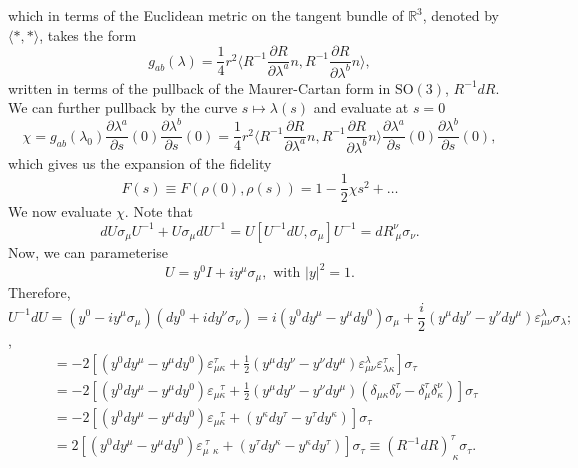 which in terms of the Euclidean metric on the tangent bundle of $\mathbb{R}^3$, denoted by $\langle \ast , \ast\rangle$, takes the form
\begin{equation*} 
g_{ab}(\lambda)=\frac{1}{4} r^2\langle R^{-1}\frac{\partial R}{\partial \lambda^{a}}n,  R^{-1}\frac{\partial R}{\partial \lambda^{b}} n\rangle,
\end{equation*}
written in terms of the pullback of the Maurer-Cartan form in $\text{SO}(3)$, $R^{-1}dR$. We can further pullback by the curve $s\mapsto \lambda(s)$ and evaluate at $s=0$
\begin{equation*}
\chi=g_{ab}(\lambda_0)\frac{\partial \lambda^a}{\partial s}(0)\frac{\partial \lambda^{b}}{\partial s}(0)=\frac{1}{4} r^2\langle R^{-1}\frac{\partial R}{\partial \lambda^{a}}n,  R^{-1}\frac{\partial R}{\partial \lambda^{b}} n\rangle\frac{\partial \lambda^a}{\partial s}(0)\frac{\partial \lambda^{b}}{\partial s}(0),
\end{equation*}
which gives us the expansion of the fidelity
\begin{equation*}
F(s)\equiv F(\rho(0),\rho(s))=1-\frac{1}{2}\chi s^2 +\dots
\end{equation*}
We now evaluate $\chi$. Note that
\begin{equation*}
dU\sigma_{\mu}U^{-1} +U\sigma_{\mu}dU^{-1} = U[U^{-1}dU,\sigma_{\mu}]U^{-1} = dR^{\nu}_{\ \mu}\sigma_\nu.
\end{equation*}
Now, we can parameterise
\begin{equation*}
U=y^{0}I+iy^{\mu}\sigma_{\mu}, \text{ with } |y|^2=1. 
\end{equation*}
Therefore,
\begin{equation*}
U^{-1}dU=(y^0 -iy^{\mu}\sigma_\mu)(dy^0 +idy^{\nu}\sigma_{\nu})
=i(y^0dy^{\mu}-y^{\mu}dy^{0})\sigma_{\mu}+\frac{i}{2}(y^{\mu}dy^{\nu} - y^{\nu}dy^{\mu})\varepsilon_{\mu\nu}^{\lambda}\sigma_{\lambda};
\end{equation*},
\begin{eqnarray*}
[U^{-1}dU,\sigma_{\kappa}]&=-2\left[(y^0dy^{\mu}-y^{\mu}dy^{0})\varepsilon_{\mu\kappa}^{\tau}+\frac{1}{2}(y^{\mu}dy^{\nu} - y^{\nu}dy^{\mu})\varepsilon_{\mu\nu}^{\lambda}\varepsilon_{\lambda\kappa}^{\tau}\right]\sigma_{\tau}\\
&=-2\left[(y^0dy^{\mu}-y^{\mu}dy^{0})\varepsilon_{\mu\kappa}^{\ \ \ \tau}+\frac{1}{2}(y^{\mu}dy^{\nu} - y^{\nu}dy^{\mu})(\delta_{\mu\kappa}\delta^{\tau}_{\nu}-\delta_{\mu}^{\tau}\delta^{\nu}_{\kappa})\right]\sigma_{\tau}\\
&=-2\left[(y^0dy^{\mu}-y^{\mu}dy^{0})\varepsilon_{\mu\kappa}^{\ \ \ \tau}+(y^{\kappa}dy^{\tau}-y^{\tau}dy^{\kappa})\right]\sigma_{\tau}\\
&=2\left[(y^0dy^{\mu}-y^{\mu}dy^{0})\varepsilon_{\mu\ \ \kappa}^{\ \tau}+(y^{\tau}dy^{\kappa}-y^{\kappa}dy^{\tau})\right]\sigma_{\tau}\equiv (R^{-1}dR)^{\tau}_{\ \kappa}\sigma_{\tau}.
\end{eqnarray*}
